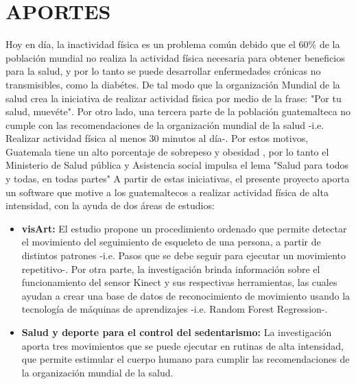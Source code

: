 \section{APORTES}
Hoy en d\'ia, la inactividad f\'isica es un problema com\'un debido que el 60\% de la poblaci\'on mundial no realiza la actividad f\'isica necesaria para obtener beneficios para la salud, y por lo tanto se puede desarrollar enfermedades cr\'onicas no transmisibles, como la diab\'etes. De tal modo que la organizaci\'on Mundial de la salud crea la iniciativa de realizar actividad f\'isica por medio de la frase: "Por tu salud, muev\'ete". \cite{orgSaludAF}
\medbreak
Por otro lado, una tercera parte de la poblaci\'on guatemalteca no cumple con las recomendaciones de la organizaci\'on mundial de la salud -i.e. Realizar actividad f\'isica al menos 30 minutos al d\'ia-. Por estos motivos, Guatemala tiene un alto porcentaje de sobrepeso y obesidad , por lo tanto el Ministerio de Salud p\'ublica y Asistencia social impulsa el lema "Salud para todos y todas, en todas partes" \cite{minSaludPub}
\medbreak
A partir de estas iniciativas, el presente proyecto aporta un software que motive a los guatemaltecos a realizar actividad f\'isica de alta intensidad, con la ayuda de dos \'areas de estudios:
\begin{itemize}
	\item \textbf{\gls{visArt}:} El estudio propone un procedimiento ordenado que permite detectar el movimiento del seguimiento de esqueleto de una persona, a partir de distintos patrones -i.e. Pasos que se debe seguir para ejecutar un movimiento repetitivo-. Por otra parte, la investigaci\'on brinda informaci\'on sobre el funcionamiento del sensor Kinect y sus respectivas herramientas, las cuales ayudan a crear una base de datos de reconocimiento de  movimiento usando la tecnolog\'ia de m\'aquinas de aprendizajes -i.e. Random Forest Regression-.
	\item \textbf{Salud y deporte para el control del sedentarismo:} La investigaci\'on aporta tres movimientos que se puede ejecutar en rutinas de alta intensidad, que permite estimular el cuerpo humano para cumplir las recomendaciones de la organizaci\'on mundial de la salud.
\end{itemize}